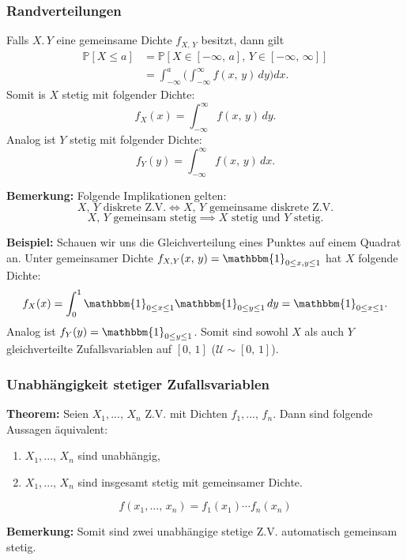 \documentclass[a4paper]{extarticle}
\begin{document}
\subsubsection{Randverteilungen}

Falls $X. \, Y$ eine gemeinsame Dichte $f_{X, \, Y}$ besitzt, dann gilt
\begin{align*}
    \mathbb{P}[X \leq a] &= \mathbb{P}[X \in [- \infty, \, a], \, Y \in [- \infty, \, \infty]]\\ &= \int_{- \infty}^a \Big(\int_{- \infty}^{\infty} f(x, \, y)\,dy \Big)dx.
\end{align*}
Somit is $X$ stetig mit folgender Dichte:
\[
    f_X(x) = \int_{- \infty}^{\infty} f(x, \, y) \, dy.
\]
Analog ist $Y$ stetig mit folgender Dichte:
\[
    f_Y(y) = \int_{- \infty}^{\infty} f(x, \, y) \, dx.
\]

\textbf{Bemerkung:} Folgende Implikationen gelten:
\[
    X, \, Y \text{ diskrete Z.V.} \iff X, \, Y \text{ gemeinsame diskrete Z.V.}
\]
\[
    X, \, Y \text{ gemeinsam stetig} \implies X \text{ stetig und } Y \text{ stetig}.
\]

\begin{ebox}
    \textbf{Beispiel:} Schauen wir uns die Gleichverteilung eines Punktes auf einem Quadrat an. Unter gemeinsamer Dichte $f_{X,Y}(x, \, y) = \mathbbm{1}_{0 \leq x,y \leq 1}$ hat $X$ folgende Dichte:
    \[
        f_X(x) = \int_0^1 \mathbbm{1}_{0 \leq x \leq 1} \mathbbm{1}_{0 \leq y \leq 1} \, dy = \mathbbm{1}_{0 \leq x \leq 1}.
    \]
    Analog ist $f_Y(y) = \mathbbm{1}_{0 \leq y \leq 1}$. Somit sind sowohl $X$ als auch $Y$ gleichverteilte Zufallsvariablen auf $[0, \, 1]$ ($\mathcal{U} \sim [0, \, 1]$).
\end{ebox}

\subsubsection{Unabhängigkeit stetiger Zufallsvariablen}

\begin{tbox}
    \textbf{Theorem:} Seien $X_1,..., \, X_n$ Z.V. mit Dichten $f_1,..., \, f_n$. Dann sind folgende Aussagen äquivalent:
    \begin{enumerate}
        \item $X_1,..., \, X_n$ sind unabhängig,
        \item $X_1,..., \, X_n$ sind insgesamt stetig mit gemeinsamer Dichte.
    \end{enumerate}
    \[
        f(x_1,..., \, x_n) = f_1(x_1) \cdots f_n(x_n)
    \]
\end{tbox}

\textbf{Bemerkung:} Somit sind zwei unabhängige stetige Z.V. automatisch gemeinsam stetig.
\end{document}
